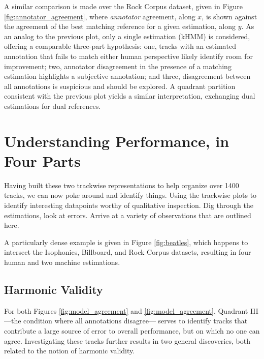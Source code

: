 \documentclass{article}
\begin{document}
A similar comparison is made over the Rock Corpus dataset, given in Figure \ref{fig:annotator_agreement}, where \emph{annotator} agreement, along $x$, is shown against the agreement of the best matching reference for a given estimation, along $y$.
As an analog to the previous plot, only a single estimation (kHMM) is considered, offering a comparable three-part hypothesis:
one, tracks with an estimated annotation that fails to match either human perspective likely identify room for improvement;
two, annotator disagreement in the presence of a matching estimation highlights a subjective annotation;
and three, disagreement between all annotations is suspicious and should be explored.
A quadrant partition consistent with the previous plot yields a similar interpretation, exchanging dual estimations for dual references.


\section{Understanding Performance, in Four Parts}
\label{sec:data_analysis}

Having built these two trackwise representations to help organize over 1400 tracks, we can now poke around and identify things.
Using the trackwise plots to identify interesting datapoints worthy of qualitative inspection.
Dig through the estimations, look at errors.
Arrive at a variety of observations that are outlined here.

A particularly dense example is given in Figure \ref{fig:beatles}, which happens to intersect the Isophonics, Billboard, and Rock Corpus datasets, resulting in four human and two machine estimations.



\subsection{Harmonic Validity}
\label{subsec:validity}

For both Figures \ref{fig:model_agreement} and \ref{fig:model_agreement}, Quadrant III ---the condition where all annotations disagree--- serves to identify tracks that contribute a large source of error to overall performance, but on which no one can agree.
Investigating these tracks further results in two general discoveries, both related to the notion of harmonic validity.

\end{document}
